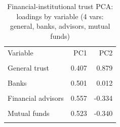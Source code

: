 \begin{table}[htbp]\centering\small
\caption{Financial-institutional trust PCA: loadings by variable (4 vars: general, banks, advisors, mutual funds)}
\label{tab:fin_trust_loadings}
\begin{tabular}{lrr}\toprule
Variable & PC1 & PC2 \\\\ \midrule
General trust & 0.407 & 0.879 \\\\
Banks & 0.501 & 0.012 \\\\
Financial advisors & 0.557 & -0.334 \\\\
Mutual funds & 0.523 & -0.340 \\\\
\bottomrule
\end{tabular}\end{table}
